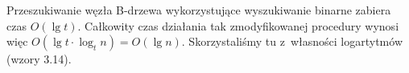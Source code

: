 
\exercise %
\exercise %
\exercise %
\exercise %
\exercise %
\exercise %
Przeszukiwanie węzła B-drzewa wykorzystujące wyszukiwanie binarne zabiera czas $O(\lg t)$.
Całkowity czas działania tak zmodyfikowanej procedury  wynosi więc $O(\lg t\cdot\log_tn)=O(\lg n)$.
Skorzystaliśmy tu z~własności logartytmów (wzory 3.14).

\exercise %
